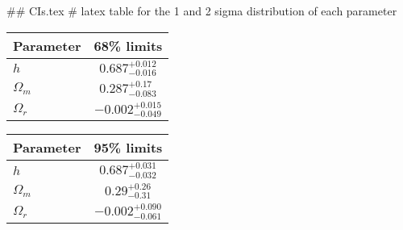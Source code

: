 ## CIs.tex
# latex table for the 1 and 2 sigma distribution of each parameter

\begin{tabular} { l  c}
 Parameter &  68\% limits\\
\hline
{\boldmath$h              $} & $0.687^{+0.012}_{-0.016}   $\\
{\boldmath$\Omega_m       $} & $0.287^{+0.17}_{-0.083}    $\\
{\boldmath$\Omega_r       $} & $-0.002^{+0.015}_{-0.049}  $\\
\hline
\end{tabular}

\begin{tabular} { l  c}
 Parameter &  95\% limits\\
\hline
{\boldmath$h              $} & $0.687^{+0.031}_{-0.032}   $\\
{\boldmath$\Omega_m       $} & $0.29^{+0.26}_{-0.31}      $\\
{\boldmath$\Omega_r       $} & $-0.002^{+0.090}_{-0.061}  $\\
\hline
\end{tabular}
